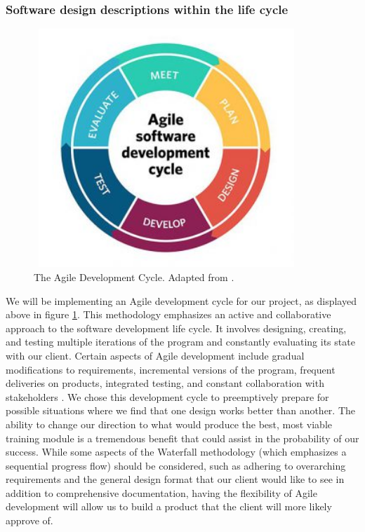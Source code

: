 \documentclass[onecolumn, draftclsnofoot,10pt, compsoc]{IEEEtran}
\begin{document}
\subsubsection{Software design descriptions within the life cycle}
\begin{center}
    \begin{figure}[h]
        \centering
        \includegraphics[width=10cm, height=9cm]{agile.jpg}
        \caption{The Agile Development Cycle. Adapted from \cite{1}.}
        \label{fig:mesh1}
    \end{figure}
\end{center}

We will be implementing an Agile development cycle for our project, as displayed above in  figure \ref{fig:mesh1}. This methodology emphasizes an active and collaborative approach to the software development life cycle. It involves designing, creating, and testing multiple iterations of the program and constantly evaluating its state with our client. Certain aspects of Agile development include gradual modifications to requirements, incremental versions of the program, frequent deliveries on products, integrated testing, and constant collaboration with stakeholders \cite{1}. We chose this development cycle to preemptively prepare for possible situations where we find that one design works better than another. The ability to change our direction to what would produce the best, most viable training module is a tremendous benefit that could assist in the probability of our success. While some aspects of the Waterfall methodology (which emphasizes a sequential progress flow) should be considered, such as adhering to overarching requirements and the general design format that our client would like to see in addition to comprehensive documentation, having the flexibility of Agile development will allow us to build a product that the client will more likely approve of.  
\end{document}

